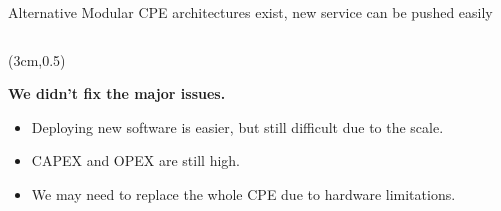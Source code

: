 \documentclass[a4paper]{beamer}
\begin{document}
\begin{frame}{Alternative Modular CPE architectures exist, new service can be pushed easily}
\begin{columns}[T]
	\end{columns}
					
						
						
					
	\begin{textblock*}{7cm}(3cm,0.5\textheight)
		\begin{alertblock}{}
			\textbf{  We didn't fix the major issues. }
			\begin{itemize}
				\item Deploying new software is easier, but still difficult due to the scale.
				\item CAPEX and OPEX are still high.
				\item We may need to replace the whole CPE due to hardware limitations.
			\end{itemize}
		\end{alertblock}
	\end{textblock*}			
									
							
								
\end{frame}
\end{document}
